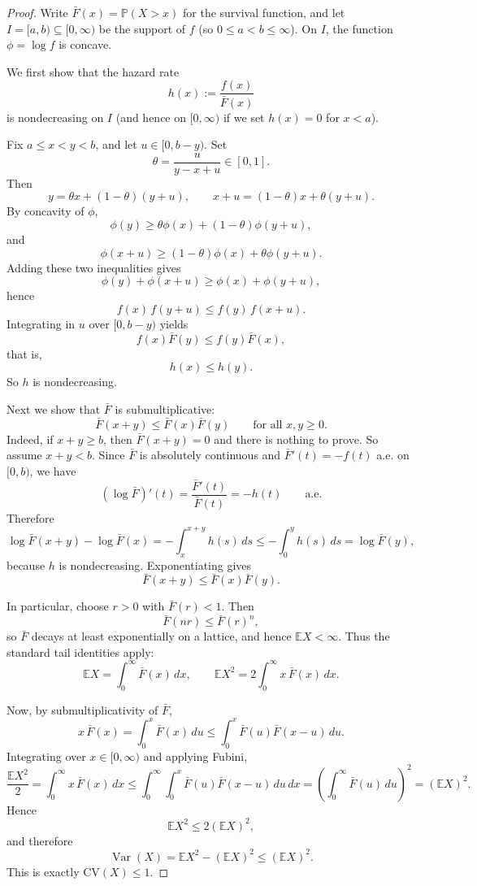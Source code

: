 \documentclass[12pt,a4paper]{article}
\theoremstyle{definition}
\theoremstyle{plain}
\theoremstyle{remark}
\begin{document}
  \begin{proof}
  Write $\bar F(x)=\mathbb P(X>x)$ for the survival function, and let
  $I=[a,b)\subseteq [0,\infty)$ be the support of $f$ (so $0\le a<b\le\infty$).
  On $I$, the function $\phi=\log f$ is concave.
  
  We first show that the hazard rate
  \[
  h(x):=\frac{f(x)}{\bar F(x)}
  \]
  is nondecreasing on $I$ (and hence on $[0,\infty)$ if we set $h(x)=0$ for $x<a$).
  
  Fix $a\le x<y<b$, and let $u\in[0,b-y)$. Set
  \[
  \theta=\frac{u}{y-x+u}\in[0,1].
  \]
  Then
  \[
  y=\theta x+(1-\theta)(y+u),
  \qquad
  x+u=(1-\theta)x+\theta(y+u).
  \]
  By concavity of $\phi$,
  \[
  \phi(y)\ge \theta \phi(x)+(1-\theta)\phi(y+u),
  \]
  and
  \[
  \phi(x+u)\ge (1-\theta)\phi(x)+\theta\phi(y+u).
  \]
  Adding these two inequalities gives
  \[
  \phi(y)+\phi(x+u)\ge \phi(x)+\phi(y+u),
  \]
  hence
  \[
  f(x)\,f(y+u)\le f(y)\,f(x+u).
  \]
  Integrating in $u$ over $[0,b-y)$ yields
  \[
  f(x)\bar F(y)\le f(y)\bar F(x),
  \]
  that is,
  \[
  h(x)\le h(y).
  \]
  So $h$ is nondecreasing.
  
  Next we show that $\bar F$ is submultiplicative:
  \[
  \bar F(x+y)\le \bar F(x)\bar F(y)
  \qquad\text{for all }x,y\ge0.
  \]
  Indeed, if $x+y\ge b$, then $\bar F(x+y)=0$ and there is nothing to prove.
  So assume $x+y<b$. Since $\bar F$ is absolutely continuous and
  $\bar F'(t)=-f(t)$ a.e. on $[0,b)$, we have
  \[
  (\log \bar F)'(t)=\frac{\bar F'(t)}{\bar F(t)}=-h(t)
  \qquad\text{a.e.}
  \]
  Therefore
  \[
  \log \bar F(x+y)-\log \bar F(x)
  =
  -\int_x^{x+y} h(s)\,ds
  \le
  -\int_0^y h(s)\,ds
  =
  \log \bar F(y),
  \]
  because $h$ is nondecreasing. Exponentiating gives
  \[
  \bar F(x+y)\le \bar F(x)\bar F(y).
  \]
  
  In particular, choose $r>0$ with $\bar F(r)<1$. Then
  \[
  \bar F(nr)\le \bar F(r)^n,
  \]
  so $\bar F$ decays at least exponentially on a lattice, and hence
  $\mathbb E X<\infty$. Thus the standard tail identities apply:
  \[
  \mathbb E X=\int_0^\infty \bar F(x)\,dx,
  \qquad
  \mathbb E X^2 = 2\int_0^\infty x\,\bar F(x)\,dx.
  \]
  
  Now, by submultiplicativity of $\bar F$,
  \[
  x\,\bar F(x)=\int_0^x \bar F(x)\,du
  \le
  \int_0^x \bar F(u)\bar F(x-u)\,du.
  \]
  Integrating over $x\in[0,\infty)$ and applying Fubini,
  \[
  \frac{\mathbb E X^2}{2}
  =
  \int_0^\infty x\,\bar F(x)\,dx
  \le
  \int_0^\infty\int_0^x \bar F(u)\bar F(x-u)\,du\,dx
  =
  \left(\int_0^\infty \bar F(u)\,du\right)^2
  =
  (\mathbb E X)^2.
  \]
  Hence
  \[
  \mathbb E X^2\le 2(\mathbb E X)^2,
  \]
  and therefore
  \[
  \operatorname{Var}(X)
  =
  \mathbb E X^2-(\mathbb E X)^2
  \le
  (\mathbb E X)^2.
  \]
  This is exactly $\mathrm{CV}(X)\le 1$.
  \end{proof}
\end{document}
